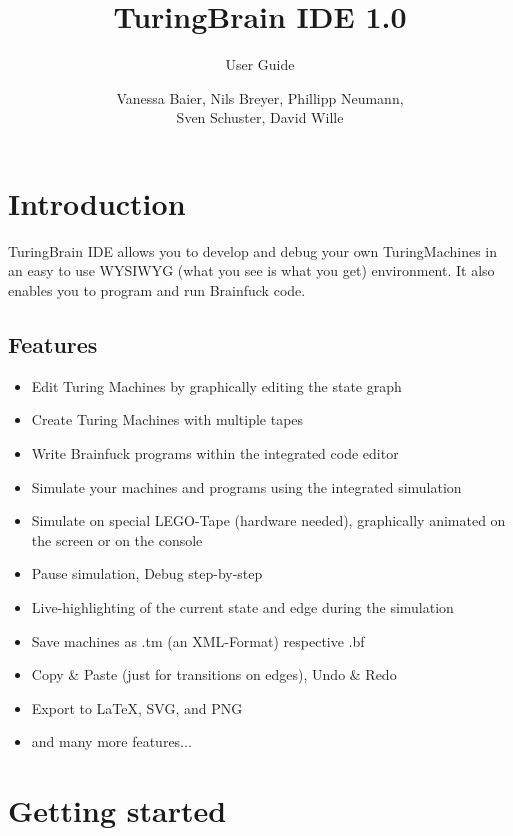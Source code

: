 \documentclass[%
  a4paper,%
  11pt,%
  blue,%
  hyperref	%
  ]{tubsartcl}
\title{TuringBrain IDE \LARGE 1.0}
\subtitle{User Guide}
\author{\small Vanessa Baier, Nils Breyer, Phillipp Neumann,\\ Sven Schuster, David Wille}
\begin{document}
\maketitle[image,logo=right]%

\tableofcontents
\clearpage
\section{Introduction}

TuringBrain IDE allows you to develop and debug your own TuringMachines in an easy to use WYSIWYG (what you see is what you get) environment. It also enables you to program and run Brainfuck code.

\subsection{Features}

\begin{itemize}
  \item Edit Turing Machines by graphically editing the state graph
  \item Create Turing Machines with multiple tapes
  \item Write Brainfuck programs within the integrated code editor
  \item Simulate your machines and programs using the integrated simulation
  \item Simulate on special LEGO\textregistered -Tape (hardware needed), graphically animated on the screen or on the console
  \item Pause simulation, Debug step-by-step
  \item Live-highlighting of the current state and edge during the simulation
  \item Save machines as .tm (an XML-Format) respective .bf
  \item Copy \& Paste (just for transitions on edges), Undo \& Redo
  \item Export to \LaTeX , SVG, and PNG
  \item and many more features...
\end{itemize}

\section{Getting started}
\end{document}

